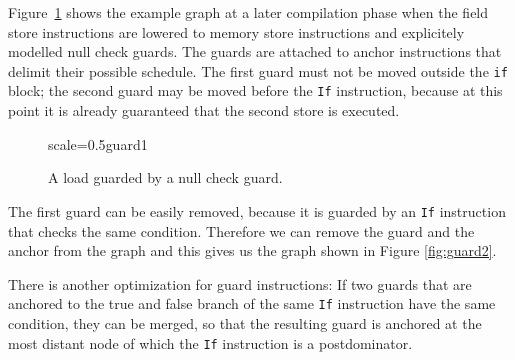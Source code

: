 \documentclass[twocolumn]{svjour3}
\begin{document}
Figure~\ref{fig:guard1} shows the example graph at a later compilation phase when the field store instructions are lowered to memory store instructions and explicitely modelled null check guards.
The guards are attached to anchor instructions that delimit their possible schedule.
The first guard must not be moved outside the \texttt{if} block; the second guard may be moved before the \texttt{If} instruction, because at this point it is already guaranteed that the second store is executed.

\begin{figure}[ht]
  \centering
\begin{digraphenv}{scale=0.5}{guard1}
\end{digraphenv}
  \caption{A load guarded by a null check guard.}
  \label{fig:guard1}
\end{figure}

The first guard can be easily removed, because it is guarded by an \texttt{If} instruction that checks the same condition.
Therefore we can remove the guard and the anchor from the graph and this gives us the graph shown in Figure \ref{fig:guard2}.

There is another optimization for guard instructions: If two guards that are anchored to the true and false branch of the same \texttt{If} instruction have the same condition, they can be merged, so that the resulting guard is anchored at the most distant node of which the \texttt{If} instruction is a postdominator.
\end{document}
